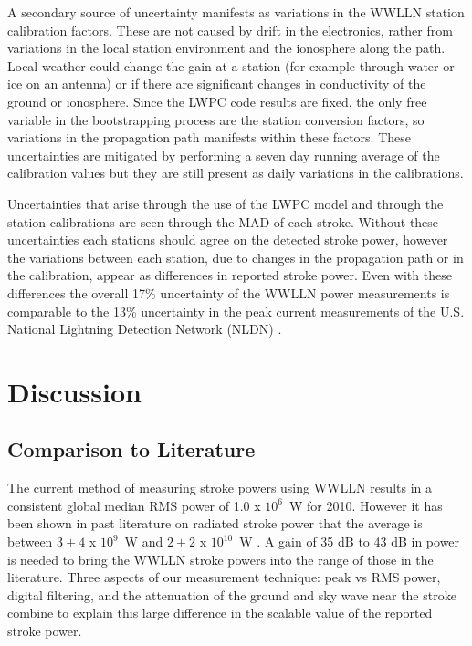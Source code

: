 A secondary source of uncertainty manifests as variations in the WWLLN station calibration factors.
These are not caused by drift in the electronics, rather from variations in the local station environment and the ionosphere along the path.
Local weather could change the gain at a station (for example through water or ice on an antenna) or if there are significant changes in conductivity of the ground or ionosphere.
Since the LWPC code results are fixed, the only free variable in the bootstrapping process are the station conversion factors, so variations in the propagation path manifests within these factors.
These uncertainties are mitigated by performing a seven day running average of the calibration values but they are still present as daily variations in the calibrations.

Uncertainties that arise through the use of the LWPC model and through the station calibrations are seen through the MAD of each stroke.
Without these uncertainties each stations should agree on the detected stroke power, however the variations between each station, due to changes in the propagation path or in the calibration, appear as differences in reported stroke power.
Even with these differences the overall 17\% uncertainty of the WWLLN power measurements is comparable to the 13\% uncertainty in the peak current measurements of the U.S. National Lightning Detection Network (NLDN) \citep{Nag2011}.

\section{Discussion}

\subsection{Comparison to Literature}

The current method of measuring stroke powers using WWLLN results in a consistent global median RMS power of 1.0 x $10^6$~W for 2010.
However it has been shown in past literature on radiated stroke power that the average is between $3\pm4$ x $10^9$~W and  $2\pm2$ x $10^{10}$~W \citep{Krider1983}.
A gain of 35 dB to 43 dB in power is needed to bring the WWLLN stroke powers into the range of those in the literature.
Three aspects of our measurement technique: peak vs RMS power, digital filtering, and the attenuation of the ground and sky wave near the stroke combine to explain this large difference in the scalable value of the reported stroke power.

